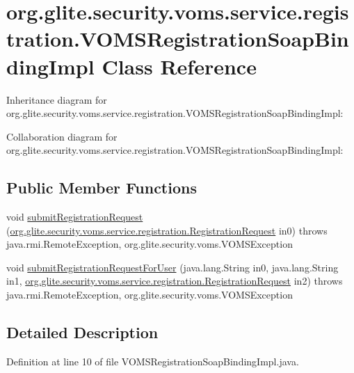 \hypertarget{classorg_1_1glite_1_1security_1_1voms_1_1service_1_1registration_1_1VOMSRegistrationSoapBindingImpl}{
\section{org.glite.security.voms.service.registration.VOMSRegistrationSoapBindingImpl Class Reference}
\label{classorg_1_1glite_1_1security_1_1voms_1_1service_1_1registration_1_1VOMSRegistrationSoapBindingImpl}
}


Inheritance diagram for org.glite.security.voms.service.registration.VOMSRegistrationSoapBindingImpl:


Collaboration diagram for org.glite.security.voms.service.registration.VOMSRegistrationSoapBindingImpl:
\subsection*{Public Member Functions}
\begin{DoxyCompactItemize}
\item 
void \hyperlink{classorg_1_1glite_1_1security_1_1voms_1_1service_1_1registration_1_1VOMSRegistrationSoapBindingImpl_a8d916954aeac05ab3a2bfdd212be32ed}{submitRegistrationRequest} (\hyperlink{classorg_1_1glite_1_1security_1_1voms_1_1service_1_1registration_1_1RegistrationRequest}{org.glite.security.voms.service.registration.RegistrationRequest} in0)  throws java.rmi.RemoteException, org.glite.security.voms.VOMSException 
\item 
void \hyperlink{classorg_1_1glite_1_1security_1_1voms_1_1service_1_1registration_1_1VOMSRegistrationSoapBindingImpl_a4709467e5325083a76e87eff45b41619}{submitRegistrationRequestForUser} (java.lang.String in0, java.lang.String in1, \hyperlink{classorg_1_1glite_1_1security_1_1voms_1_1service_1_1registration_1_1RegistrationRequest}{org.glite.security.voms.service.registration.RegistrationRequest} in2)  throws java.rmi.RemoteException, org.glite.security.voms.VOMSException 
\end{DoxyCompactItemize}


\subsection{Detailed Description}


Definition at line 10 of file VOMSRegistrationSoapBindingImpl.java.




